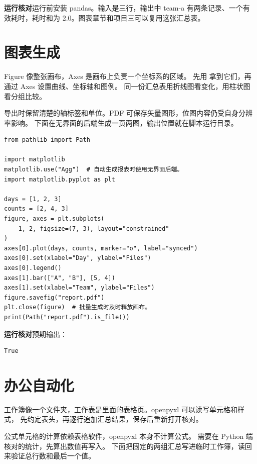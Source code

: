 \documentclass[UTF8,a4paper,oneside,openany,fontset=none,11pt]{ctexbook}
\newcommand{\code}[1]{\texttt{\detokenize{#1}}}
\begin{document}
\textbf{运行核对}\enspace 运行前安装 pandas。输入是三行，输出中 team-a 有两条记录、一个有效耗时，耗时和为 2.0。图表章节和项目三可以复用这张汇总表。

\section{图表生成}

Figure 像整张画布，Axes 是画布上负责一个坐标系的区域。
先用 \code{subplots()} 拿到它们，再通过 Axes 设置曲线、坐标轴和图例。
同一份汇总表用折线图看变化，用柱状图看分组比较。

导出时保留清楚的轴标签和单位。PDF 可保存矢量图形，位图内容仍受自身分辨率影响。
下面在无界面的后端生成一页两图，输出位置就在脚本运行目录。


\begin{lstlisting}[title={\code{draw_report.py}}]
from pathlib import Path

import matplotlib
matplotlib.use("Agg")  # 自动生成报表时使用无界面后端。
import matplotlib.pyplot as plt

days = [1, 2, 3]
counts = [2, 4, 3]
figure, axes = plt.subplots(
    1, 2, figsize=(7, 3), layout="constrained"
)
axes[0].plot(days, counts, marker="o", label="synced")
axes[0].set(xlabel="Day", ylabel="Files")
axes[0].legend()
axes[1].bar(["A", "B"], [5, 4])
axes[1].set(xlabel="Team", ylabel="Files")
figure.savefig("report.pdf")
plt.close(figure)  # 批量生成时及时释放画布。
print(Path("report.pdf").is_file())
\end{lstlisting}


\textbf{运行核对}\enspace 预期输出：
\begin{lstlisting}[language={},numbers=none]
True
\end{lstlisting}

\par


\section{办公自动化}

工作簿像一个文件夹，工作表是里面的表格页。openpyxl 可以读写单元格和样式，
先约定表头，再逐行追加汇总结果，保存后重新打开核对。

公式单元格的计算依赖表格软件，openpyxl 本身不计算公式。
需要在 Python 端核对的统计，先算出数值再写入。
下面把固定的两组汇总写进临时工作簿，读回来验证总行数和最后一个值。
\end{document}
